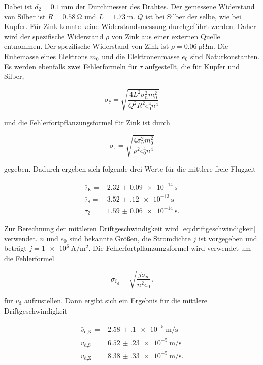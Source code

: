 Dabei ist $d_2 = \SI{0.1}{\milli\meter}$ der Durchmesser des Drahtes.
Der gemessene Widerstand von Silber ist $R = \SI{0.58}{\ohm}$ und $L = \SI{1.73}{\meter}$.
$Q$ ist bei Silber der selbe, wie bei Kupfer.
Für Zink konnte keine Widerstandsmessung durchgeführt werden.
Daher wird der spezifische Widerstand $\rho$ von Zink aus einer externen Quelle entnommen.
Der spezifische Widerstand von Zink ist $\rho = \SI{0.06}{\micro\ohm\meter}$.\cite{zink}
Die Ruhemasse eines Elektrons $m_0$ und die Elektronenmasse $e_0$ sind Naturkonstanten.\cite{physics_constants}
Es werden ebenfalls zwei Fehlerformeln für $\bar{\tau}$ aufgestellt, die für Kupfer und Silber, 

\begin{equation}
    \sigma _{\bar{\tau}} = \sqrt{\frac{4 L^{2} \sigma_{n}^{2} m_{0}^{2}}{Q^{2} R^{2} e_{0}^{4} n^{4}}}
    \label{eq:tau_fehler}
\end{equation}

und die Fehlerfortpflanzungsformel für Zink ist durch

\begin{equation}
    \sigma _{\bar{\tau}} = \sqrt{\frac{4 \sigma_{n}^{2} m_{0}^{2}}{{\rho}^{2} e_{0}^{4} n^{4}}}
    \label{eq:tau_fehler2}
\end{equation}

gegeben. 
Dadurch ergeben sich folgende drei Werte für die mittlere freie Flugzeit

\begin{align*}
    \bar{\tau}_\text{K} =& \SI{2.32(9)e-14}{\second} \\
    \bar{\tau}_\text{S} =& \SI{3.52(12)e-13}{\second} \\
    \bar{\tau}_\text{Z} =& \SI{1.59(6)e-14}{\second}.
\end{align*}

Zur Berechnung der mittleren Driftgeschwindigkeit wird \autoref{eq:driftgeschwindigkeit} verwendet.
$n$ und $e_0$ sind bekannte Größen, die Stromdichte $j$ ist vorgegeben und beträgt $j = \SI{1e6}{\ampere\per\meter\squared}$.
Die Fehlerfortpflanzungsformel wird verwendet um die Fehlerformel

\begin{equation}
    \sigma _{\bar{v}_\text{d}} = \sqrt{\frac{j \sigma _n}{n^2 e_0}}.
    \label{eq:vd_fehler}
\end{equation}

für $\bar{v}_\text{d}$ aufzustellen.
Dann ergibt sich ein Ergebnis für die mittlere Driftgeschwindigkeit 

\begin{align*}
    \bar{v}_\text{d,K} =& \SI{2.58(10)e-5}{\meter\per\second} \\
    \bar{v}_\text{d,S} =& \SI{6.52(23)e-5}{\meter\per\second} \\
    \bar{v}_\text{d,Z} =& \SI{8.38(33)e-5}{\meter\per\second}.
\end{align*}

